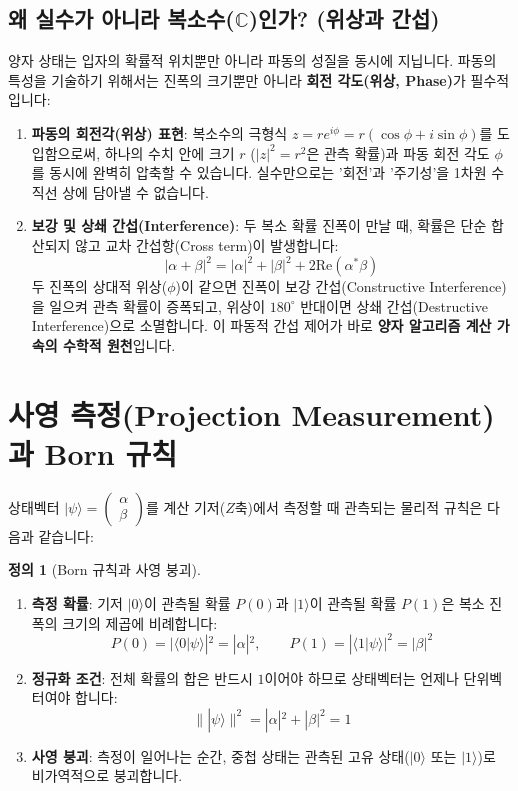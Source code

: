 \documentclass[11pt, a4paper]{article}
\newcommand{\ket}[1]{|#1\rangle}
\newcommand{\braket}[2]{\langle#1|#2\rangle}
\theoremstyle{definition}
\newtheorem{definition}{정의}[section]
\begin{document}
\subsection{왜 실수가 아니라 복소수(\texorpdfstring{$\mathbb{C}$}{C})인가? (위상과 간섭)}
양자 상태는 입자의 확률적 위치뿐만 아니라 파동의 성질을 동시에 지닙니다. 파동의 특성을 기술하기 위해서는 진폭의 크기뿐만 아니라 \textbf{회전 각도(위상, Phase)}가 필수적입니다:
\begin{enumerate}
    \item \textbf{파동의 회전각(위상) 표현}: 복소수의 극형식 $z = r e^{i\phi} = r(\cos\phi + i\sin\phi)$를 도입함으로써, 하나의 수치 안에 크기 $r$ ($|z|^2=r^2$은 관측 확률)과 파동 회전 각도 $\phi$를 동시에 완벽히 압축할 수 있습니다. 실수만으로는 '회전'과 '주기성'을 1차원 수직선 상에 담아낼 수 없습니다.
    \item \textbf{보강 및 상쇄 간섭(Interference)}: 두 복소 확률 진폭이 만날 때, 확률은 단순 합산되지 않고 교차 간섭항(Cross term)이 발생합니다:
    $$|\alpha + \beta|^2 = |\alpha|^2 + |\beta|^2 + 2\text{Re}(\alpha^* \beta)$$
    두 진폭의 상대적 위상($\phi$)이 같으면 진폭이 보강 간섭(Constructive Interference)을 일으켜 관측 확률이 증폭되고, 위상이 $180^\circ$ 반대이면 상쇄 간섭(Destructive Interference)으로 소멸합니다. 이 파동적 간섭 제어가 바로 \textbf{양자 알고리즘 계산 가속의 수학적 원천}입니다.
\end{enumerate}

\section{사영 측정(Projection Measurement)과 Born 규칙}
상태벡터 $\ket{\psi} = \begin{pmatrix} \alpha \\ \beta \end{pmatrix}$를 계산 기저($Z$축)에서 측정할 때 관측되는 물리적 규칙은 다음과 같습니다:

\begin{definition}[Born 규칙과 사영 붕괴]
\begin{enumerate}
    \item \textbf{측정 확률}: 기저 $\ket{0}$이 관측될 확률 $P(0)$과 $\ket{1}$이 관측될 확률 $P(1)$은 복소 진폭의 크기의 제곱에 비례합니다:
    $$P(0) = |\braket{0}{\psi}|^2 = |\alpha|^2, \qquad P(1) = |\braket{1}{\psi}|^2 = |\beta|^2$$
    \item \textbf{정규화 조건}: 전체 확률의 합은 반드시 $1$이어야 하므로 상태벡터는 언제나 단위벡터여야 합니다:
    $$\|\ket{\psi}\|^2 = |\alpha|^2 + |\beta|^2 = 1$$
    \item \textbf{사영 붕괴}: 측정이 일어나는 순간, 중첩 상태는 관측된 고유 상태($\ket{0}$ 또는 $\ket{1}$)로 비가역적으로 붕괴합니다.
\end{enumerate}
\end{definition}
\end{document}
